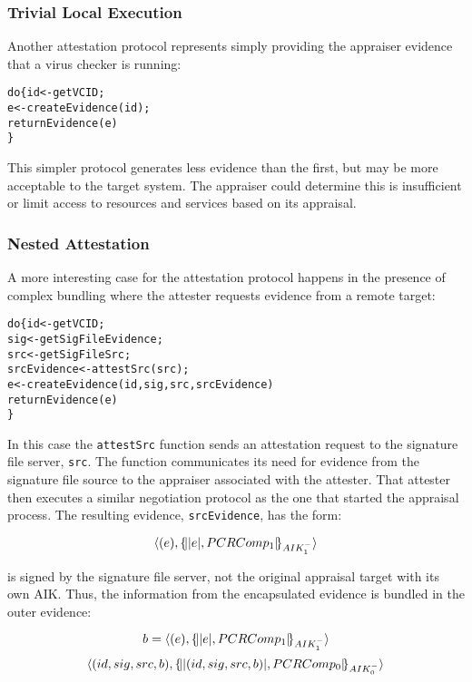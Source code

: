 \documentclass[10pt]{article}
\begin{document}
\subsubsection*{Trivial Local Execution}

Another attestation protocol represents simply providing the appraiser
evidence that a virus checker is running:

\begin{alltt}
  do \{ id <- getVCID;
       e <- createEvidence(id);
       returnEvidence(e)
  \}
\end{alltt}

This simpler protocol generates less evidence than the first, but may
be more acceptable to the target system.  The appraiser could
determine this is insufficient or limit access to resources and
services based on its appraisal.

\subsubsection*{Nested Attestation}

A more interesting case for the attestation protocol happens in the
presence of complex bundling where the attester requests evidence from
a remote target:

\begin{alltt}
  do \{ id <- getVCID;
       sig <- getSigFileEvidence;
       src <- getSigFileSrc;
       srcEvidence <- attestSrc(src);
       e <- createEvidence(id,sig,src,srcEvidence)
       returnEvidence(e)
  \}
\end{alltt}

In this case the \Verb+attestSrc+ function sends an attestation
request to the signature file server, \Verb+src+. The function
communicates its need for evidence from the signature file source to
the appraiser associated with the attester.  That attester then
executes a similar negotiation protocol as the one that started the
appraisal process.  The resulting evidence, \Verb+srcEvidence+, has
the form:

\[\langle (e),\{\!\lvert \lvert e \rvert,PCRComp_1\rvert\!\}_{AIK_1^{-}}\rangle\]

is signed by the signature file server, not the original appraisal
target with its own AIK. Thus, the information from the encapsulated
evidence is bundled in the outer evidence:

\[b=\langle (e),\{\!\lvert \lvert e \rvert,PCRComp_1\rvert\!\}_{AIK_1^{-}}\rangle\]
\[\langle (id,sig,src,b),\{\!\lvert \lvert (id,sig,src,b) \rvert,PCRComp_0\rvert\!\}_{AIK_0^{-}}\rangle\]
\end{document}
